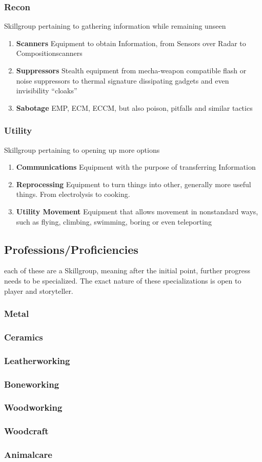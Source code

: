 \subsubsection{Recon}
Skillgroup pertaining to gathering information while remaining unseen
\begin{enumerate}[label= -]
    \item \textbf{Scanners} Equipment to obtain Information, from Sensors over Radar to Compositionscanners
    \item \textbf{Suppressors} Stealth equipment from mecha-weapon compatible flash or noise suppressors to thermal
    signature dissipating gadgets and even invisibility ``cloaks''
    \item \textbf{Sabotage} EMP, ECM, ECCM, but also poison, pitfalls and similar tactics
\end{enumerate}
\subsubsection{Utility}
Skillgroup pertaining to opening up more options
\begin{enumerate}[label= -]
    \item \textbf{Communications} Equipment with the purpose of transferring Information
    \item \textbf{Reprocessing} Equipment to turn things into other, generally more useful things.
    From electrolysis to cooking.
    \item \textbf{Utility Movement} Equipment that allows movement in nonstandard ways, such as flying, climbing,
    swimming, boring or even teleporting
\end{enumerate}
\subsection{Professions/Proficiencies}\label{subsec:professions}
each of these are a Skillgroup, meaning after the initial point, further progress needs to be specialized.
The exact nature of these specializations is open to player and storyteller.
\subsubsection{Metal}\label{subsubsec:metal}
\subsubsection{Ceramics}\label{subsubsec:ceramics}
\subsubsection{Leatherworking}\label{subsubsec:leatherworking}
\subsubsection{Boneworking}\label{subsubsec:boneworking}
\subsubsection{Woodworking}\label{subsubsec:woodworking}
\subsubsection{Woodcraft}\label{subsubsec:woodcraft}
\subsubsection{Animalcare}\label{subsubsec:animalcare}
